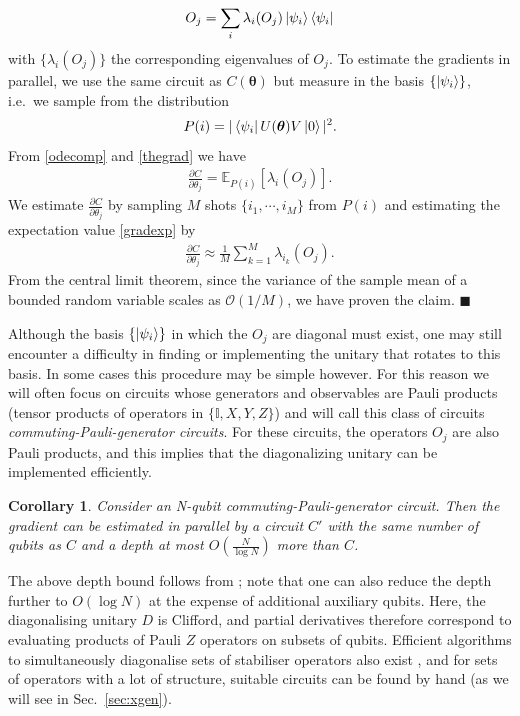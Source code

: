 \documentclass[a4paper,twocolumn,11pt]{quantumarticle}
\newtheorem{corollary}{Corollary}
\renewcommand{\vec}{\boldsymbol}
\begin{document}
%
\begin{align}\label{odecomp}
    O_j = \sum_{i} \lambda_i(O_j)\ket{\psi_i}\bra{\psi_i}
\end{align}
%
with $\{\lambda_i(O_j)\}$ the corresponding eigenvalues of $O_j$. To estimate the gradients in parallel, we use the same circuit as $C(\vec{\theta})$ but measure in the basis $\{\ket{\psi_i}\}$, i.e.\ we sample from the distribution 
%
\begin{align}
    P(i) = \vert\bra{\psi_i}U(\vec{\theta})V\ket{0}\vert^2.
\end{align}
%
From \eqref{odecomp} and \eqref{thegrad} we have 
%
\begin{align}\label{gradexp}
    \frac{\partial C}{\partial \theta_j} = \mathbb{E}_{P(i)}[\lambda_i(O_j)].
\end{align}
We estimate $\frac{\partial C}{\partial \theta_j}$ by sampling $M$ shots $\{i_1,\cdots,i_M\}$ from $P(i)$ and estimating the expectation value \eqref{gradexp} by
%
\begin{align}\label{postprocess}
    \frac{\partial C}{\partial \theta_j} \approx \frac{1}{M}\sum_{k=1}^M \lambda_{i_k}(O_j). 
\end{align}
%
From the central limit theorem, since the variance of the sample mean of a bounded random variable scales as $\mathcal{O}(1/M)$, we have proven the claim. $\blacksquare$


Although the basis $\{\ket{\psi_i}\}$ in which the $O_j$ are diagonal must exist, one may still encounter a difficulty in finding or implementing the unitary that rotates to this basis. In some cases this procedure may be simple however. For this reason we will often focus on circuits whose generators and observables are Pauli products (tensor products of operators in $\{\mathbb{I},X,Y,Z\}
$) and will call this class of circuits \emph{commuting-Pauli-generator circuits}. For these circuits, the operators $O_j$ are also Pauli products, and this implies that the diagonalizing unitary can be implemented efficiently.
%
\begin{corollary}
Consider an N-qubit commuting-Pauli-generator circuit. Then the gradient can be estimated in parallel by a circuit ${C}'$ with the same number of qubits as ${C}$ and a depth at most $O\left(\frac{N}{\log N}\right)$ more than ${C}$.
\end{corollary}
%
The above depth bound follows from \cite[Cor 1.2]{jiang2020optimal}; note that one can also reduce the depth further to $O(\log N)$ at the expense of additional auxiliary qubits. Here, the diagonalising unitary $D$ is Clifford, and partial derivatives therefore correspond to evaluating products of Pauli $Z$ operators on subsets of qubits. Efficient algorithms to simultaneously diagonalise sets of stabiliser operators also exist \cite{crawford2021efficient,yen2020measuring,gokhale2019minimizing}, and for sets of operators with a lot of structure, suitable circuits can be found by hand (as we will see in Sec.\ \ref{sec:xgen}). 
\end{document}
